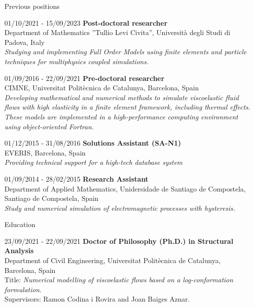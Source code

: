 \documentclass[letterpaper,english]{article}
\begin{document}
\begin{cv}{}
\begin{cvlist}{Previous positions}
    \item[\footnotesize{01/10/2021} - 15/09/2023] \textbf{Post-doctoral researcher}\\
    Department of Mathematics {”}Tullio Levi Civita”, Università degli Studi di Padova, Italy \\
    \textit{Studying and implementing Full Order Models using finite elements and particle techniques for multiphysics coupled simulations. }
    \item[\footnotesize{01/09/2016} - 22/09/2021] \textbf{Pre-doctoral researcher}\\
    CIMNE, Universitat Politècnica de Catalunya, Barcelona, Spain\\
    \textit{Developing mathematical and numerical methods to simulate viscoelastic fluid flows with high elasticity in a finite element framework, including thermal effects. These models are implemented in a high-performance computing environment using object-oriented Fortran.}
    \item[\footnotesize{01/12/2015 - 31/08/2016}]	\textbf{Solutions Assistant (SA-N1)}\\ 
    EVERIS, Barcelona, Spain\\
    \textit{Providing technical support for a high-tech database system}
    \item[\footnotesize{01/09/2014 - 28/02/2015}]	\textbf{Research Assistant} \\ 
    Department of Applied Mathematics, Unidersidade de Santiago de Compostela, Santiago de Compostela, Spain \\
    \textit{Study and numerical simulation of electromagnetic processes with hysteresis.}
\end{cvlist}
\begin{cvlist}{Education}
    \item[\footnotesize{23/09/2021 - 22/09/2021}] \textbf{Doctor of Philosophy (Ph.D.) in Structural Analysis}\\
    Department of Civil Engineering, Universitat Politècnica de Catalunya, Barcelona, Spain\\
    Title: \textit{Numerical modelling of viscoelastic flows based on a log-conformation formulation}.\\
    Supervisors: Ramon Codina i Rovira and Joan Baiges Aznar.\\

\end{cvlist}
\end{cv}
\end{document}
